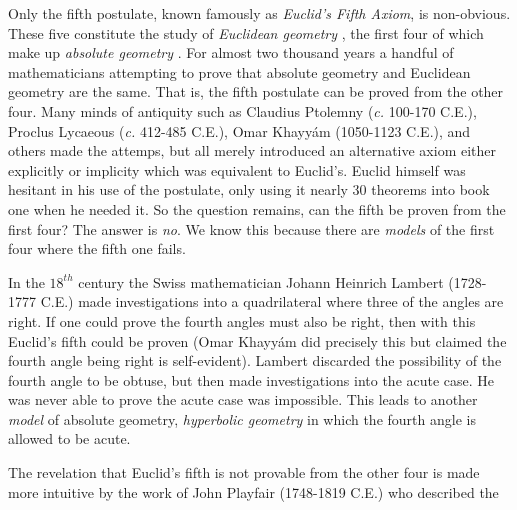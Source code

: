         Only the fifth postulate, known famously as
        \textit{Euclid's Fifth Axiom}, is
        non-obvious. These five constitute the study of
        \textit{Euclidean geometry}%
        , the first four of
        which make up \textit{absolute geometry}%
        . For almost two thousand years a handful of
        mathematicians attempting to prove that absolute geometry and Euclidean
        geometry are the same. That is, the fifth postulate can be proved from
        the other four. Many minds of antiquity such as Claudius Ptolemny%
         (\textit{c.} 100-170 C.E.), Proclus
        Lycaeous (\textit{c.} 412-485 C.E.), Omar
        Khayy\'{a}m (1050-1123 C.E.), and others
        made the attemps, but all merely introduced an alternative axiom either
        explicitly or implicity which was equivalent to Euclid's. Euclid himself
        was hesitant in his use of the postulate, only using it nearly 30
        theorems into book one when he needed it. So the question remains, can
        the fifth be proven from the first four? The answer is \textit{no}. We
        know this because there are \textit{models} of the first
        four where the fifth one fails.
        \par\hfill\par
        In the $18^{th}$ century the Swiss mathematician Johann Heinrich
        Lambert (1728-1777 C.E.) made
        investigations into a quadrilateral where three of the angles are right.
        If one could prove the fourth angles must also be right, then with this
        Euclid's fifth could be proven (Omar Khayy\'{a}m did precisely this but
        claimed the fourth angle being right is self-evident). Lambert discarded
        the possibility of the fourth angle to be obtuse, but then made
        investigations into the acute case. He was never able to prove the acute
        case was impossible. This leads to another \textit{model} of absolute
        geometry, \textit{hyperbolic geometry} in
        which the fourth angle is allowed to be acute.
        \par\hfill\par
        The revelation that Euclid's fifth is not provable from the other four
        is made more intuitive by the work of John
        Playfair (1748-1819 C.E.) who described the
